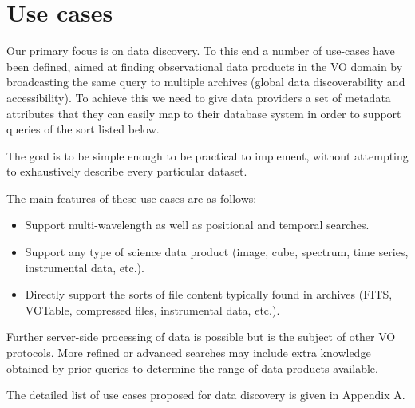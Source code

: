 \documentclass[11pt,a4paper]{ivoa}
\begin{document}
\section[Use cases]{Use cases}
\label{sec:use-cases}Our primary focus is on data discovery.  To this end a number of use-cases have been defined,
aimed at finding observational data products in the VO domain by broadcasting the same query to multiple archives
(global data discoverability and accessibility).  To achieve this we need to give data providers a set of metadata
attributes that they can easily map to their database system in order to support queries of the sort listed below.

The goal is to be simple enough to be practical to implement, without attempting to exhaustively describe every
particular dataset.

The main features of these use-cases are as follows: 

\begin{itemize}
\item Support multi-wavelength as well as positional and temporal searches.
\item Support any type of science data product (image, cube, spectrum, time series, instrumental data, etc.).
\item Directly support the sorts of file content typically found in archives (FITS, VOTable, compressed files,
instrumental data, etc.).
\end{itemize}
Further server-side processing of data is possible but is the subject of other VO protocols.  More refined or advanced
searches may include extra knowledge obtained by prior queries to determine the range of data products available.

The detailed list of use cases proposed for data discovery is given in Appendix A.



\end{document}
